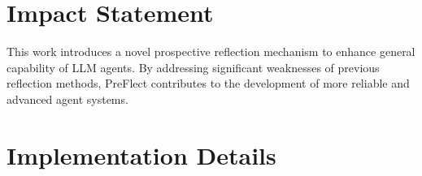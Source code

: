 \documentclass{article}
\theoremstyle{plain}
\theoremstyle{definition}
\theoremstyle{remark}
\newcommand{\method}{PreFlect\xspace}
\begin{document}



\newpage
\section*{Impact Statement}

This work introduces a novel prospective reflection mechanism to enhance general capability of LLM agents. By addressing significant weaknesses of previous reflection methods, \method contributes to the development of more reliable and advanced agent systems.





\newpage
\appendix
\onecolumn


\section{Implementation Details}
\label{appendix:imp}



\end{document}
